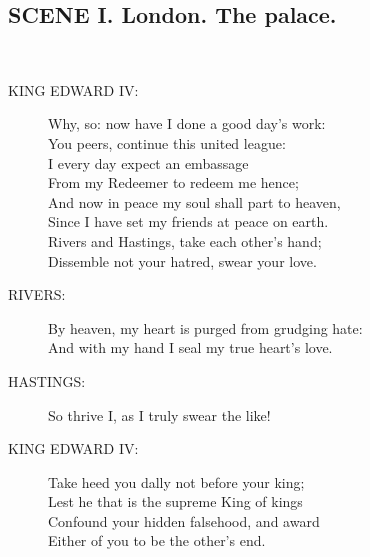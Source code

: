 \documentclass{article}
\begin{document}
\subsection*{SCENE I.  London. The palace.}
\\
\begin{description}
\item[KING EDWARD IV:] 
\hspace{1pt}Why, so: now have I done a good day's work:\\
\hspace{1pt}You peers, continue this united league:\\
\hspace{1pt}I every day expect an embassage\\
\hspace{1pt}From my Redeemer to redeem me hence;\\
\hspace{1pt}And now in peace my soul shall part to heaven,\\
\hspace{1pt}Since I have set my friends at peace on earth.\\
\hspace{1pt}Rivers and Hastings, take each other's hand;\\
\hspace{1pt}Dissemble not your hatred, swear your love.\\
\end{description}
\begin{description}
\item[RIVERS:] 
\hspace{1pt}By heaven, my heart is purged from grudging hate:\\
\hspace{1pt}And with my hand I seal my true heart's love.\\
\end{description}
\begin{description}
\item[HASTINGS:] 
\hspace{1pt}So thrive I, as I truly swear the like!\\
\end{description}
\begin{description}
\item[KING EDWARD IV:] 
\hspace{1pt}Take heed you dally not before your king;\\
\hspace{1pt}Lest he that is the supreme King of kings\\
\hspace{1pt}Confound your hidden falsehood, and award\\
\hspace{1pt}Either of you to be the other's end.\\
\end{description}
\end{document}
